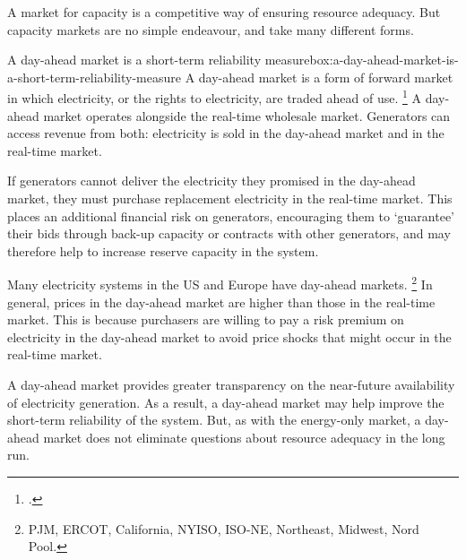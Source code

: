 \documentclass[FrontPage]{grattan}
\begin{document}
A market for capacity is a competitive way of ensuring resource adequacy. But capacity markets are no simple endeavour, and take many different forms.

\begin{smallbox}{A day-ahead market is a short-term reliability measure}{box:a-day-ahead-market-is-a-short-term-reliability-measure}
A day-ahead market is a form of forward market in which electricity, or the rights to electricity, are traded ahead of use.%
\footcite{Schubert2002WholesaleMarketDesigns}
A day-ahead market operates alongside the real-time wholesale market. Generators can access revenue from both: electricity is sold in the day-ahead market and in the real-time market.

If generators cannot deliver the electricity they promised in the day-ahead market, they must purchase replacement electricity in the real-time market. This places an additional financial risk on generators, encouraging them to `guarantee' their bids through back-up capacity or contracts with other generators, and may therefore help to increase reserve capacity in the system.

Many electricity systems in the US and Europe have day-ahead markets.%
\footnote{\eg{} PJM, ERCOT, California, NYISO, ISO-NE, Northeast, Midwest, Nord Pool.}
In general, prices in the day-ahead market are higher than those in the real-time market. This is because purchasers are willing to pay a risk premium on electricity in the day-ahead market to avoid price shocks that might occur in the real-time market.

A day-ahead market provides greater transparency on the near-future availability of electricity generation. As a result, a day-ahead market may help improve the short-term reliability of the system. But, as with the energy-only market, a day-ahead market does not eliminate questions about resource adequacy in the long run.
\end{smallbox}
\end{document}
